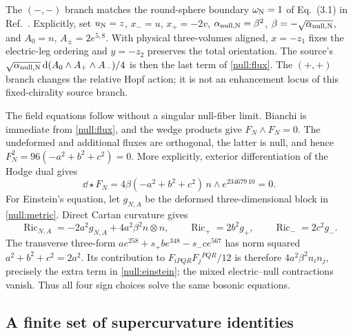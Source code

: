 The $(-,-)$ branch matches the round-sphere boundary $\omega_{\rm N}=1$ of Eq.~(3.1) in Ref.~\cite{Noris2026}. Explicitly, set $u_{\rm N}=z$, $x_-=u$, $x_+=-2v$, $\alpha_{\rm null,N}=\beta^2$, $\beta=-\sqrt{\alpha_{\rm null,N}}$, and $A_0=n$, $A_\pm=2e^{5,8}$. With physical three-volumes aligned, $x=-z_1$ fixes the electric-leg ordering and $y=-z_2$ preserves the total orientation. The source's $\sqrt{\alpha_{\rm null,N}}\,\mathrm{d}(A_0\wedge A_+\wedge A_-)/4$ is then the last term of \eqref{null:flux}. The $(+,+)$ branch changes the relative Hopf action; it is not an enhancement locus of this fixed-chirality source branch.

The field equations follow without a singular null-fiber limit. Bianchi is immediate from \eqref{null:flux}, and the wedge products give $F_N\wedge F_N=0$. The undeformed and additional fluxes are orthogonal, the latter is null, and hence $F_N^2=96(-a^2+b^2+c^2)=0$. More explicitly, exterior differentiation of the Hodge dual gives
\begin{equation}\label{null:maxwell}
\dd\star F_N=4\beta(-a^2+b^2+c^2)\,n\wedge e^{234679\,10}=0.
\end{equation}
For Einstein's equation, let $g_{N,A}$ be the deformed three-dimensional block in \eqref{null:metric}. Direct Cartan curvature gives
\begin{equation}\label{null:einstein}
 \operatorname{Ric}_{N,A}=-2a^2g_{N,A}+4a^2\beta^2 n\otimes n,
 \qquad \operatorname{Ric}_+=2b^2g_+,
 \qquad \operatorname{Ric}_-=2c^2g_-.
\end{equation}
The transverse three-form $ae^{258}+s_+be^{348}-s_-ce^{567}$ has norm squared $a^2+b^2+c^2=2a^2$. Its contribution to $F_{iPQR}F_j{}^{PQR}/12$ is therefore $4a^2\beta^2 n_i n_j$, precisely the extra term in \eqref{null:einstein}; the mixed electric--null contractions vanish. Thus all four sign choices solve the same bosonic equations.

\subsection{A finite set of supercurvature identities}

